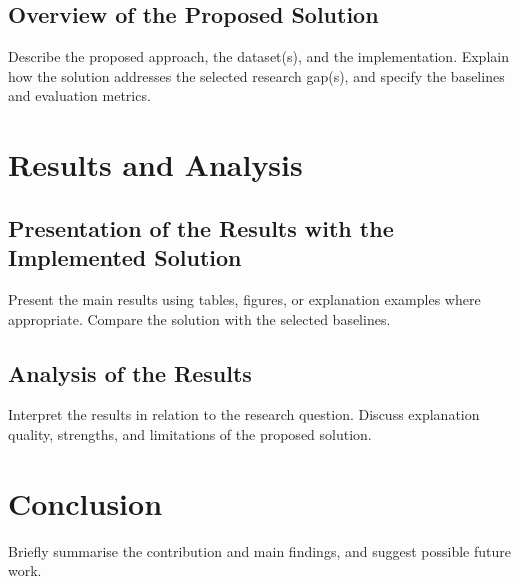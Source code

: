 \documentclass[10pt]{article}
\begin{document}
\subsection{Overview of the Proposed Solution}
Describe the proposed approach, the dataset(s), and the implementation.
Explain how the solution addresses the selected research gap(s), and
specify the baselines and evaluation metrics.

\section{Results and Analysis}

\subsection{Presentation of the Results with the Implemented Solution}
Present the main results using tables, figures, or explanation examples
where appropriate. Compare the solution with the selected baselines.

\subsection{Analysis of the Results}
Interpret the results in relation to the research question. Discuss
explanation quality, strengths, and limitations of the proposed solution.

\section{Conclusion}
Briefly summarise the contribution and main findings, and suggest
possible future work.

\nocite{example}


\end{document}
